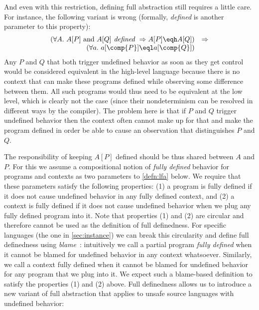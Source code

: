 \documentclass[10pt, conference, compsocconf, letterpaper, times]{IEEEtran}
\begin{document}
\fi
And even with this restriction, defining full abstraction still
requires a little care. For instance, the following variant is
wrong (formally, {\em defined} is another parameter to this property):\[
\begin{array}{rl}
(\forall A.~ A[P]\text{ and }A[Q]\textit{ defined }\Rightarrow A[P] \eqh A[Q])
&\Rightarrow\\
(\forall a.~ a[\comp{P}] \eql a[\comp{Q}])
\end{array}
\]
Any $P$ and $Q$ that both trigger undefined behavior as soon
as they get control would be considered equivalent in the high-level language
because there is no context that can make these programs defined
while observing some difference between them.
All such programs would thus need to be equivalent at the low level,
which is clearly not the case (since their nondeterminism can be resolved
in different ways by the compiler).
The problem here is that if $P$ and $Q$ trigger undefined behavior
then the context often cannot make up for that and make the program
defined in order be able to cause an observation that distinguishes
$P$ and $Q$.\ifsooner{}\fi

\label{sec:lfa}



The responsibility of keeping $A[P]$ defined should be thus shared
between $A$ and $P$.
For this we assume a compositional notion of {\em fully defined}
behavior for programs and contexts as two parameters to
\autoref{defn:lfa} below.
We require that these parameters satisfy the following properties: (1)
a program is fully defined if it does not cause undefined behavior in
any fully defined context, and (2) a context is fully defined if it
does not cause undefined behavior when we plug any fully defined
program into it.
Note that properties (1) and (2) are circular and therefore cannot be
used as the definition of full definedness.
For specific languages (\EG the one in \autoref{sec:instance}) we can
break this circularity and define full definedness using {\em
  blame}~\cite{FindlerF02prime}: intuitively we call a partial program
{\em fully defined} when it cannot be blamed for undefined behavior in
any context whatsoever.
Similarly, we call a context fully defined when it cannot be blamed
for undefined behavior for any program that we plug into it.
We expect such a blame-based definition to satisfy the properties (1)
and (2) above.
\ifsooner
{}
\fi
Full definedness allows us to introduce a new variant of
full abstraction that applies to unsafe source languages with
undefined behavior:
\end{document}
